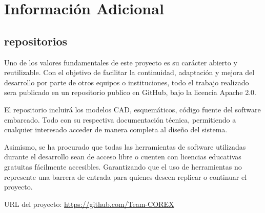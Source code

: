 \chapter{Información Adicional}

\section{repositorios}

Uno de los valores fundamentales de este proyecto es su carácter abierto y reutilizable.
Con el objetivo de facilitar la continuidad, adaptación y mejora del desarrollo por parte
de otros equipos o instituciones, todo el trabajo realizado sera publicado en un repositorio
publico en GitHub, bajo la licencia Apache 2.0.

El repositorio incluirá los modelos CAD, esquemáticos, código fuente del software
embarcado. Todo con su respectiva documentación técnica, permitiendo a cualquier interesado
acceder de manera completa al diseño del sistema.

Asimismo, se ha procurado que todas las herramientas de software utilizadas durante
el desarrollo sean de acceso libre o cuenten con licencias educativas gratuitas fácilmente
accesibles. Garantizando que el uso de herramientas no represente una barrera de
entrada para quienes deseen replicar o continuar el proyecto.

URL del proyecto: \url{https://github.com/Team-COREX}
